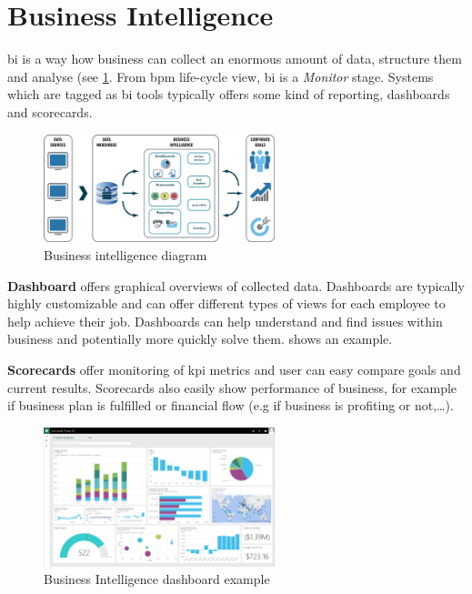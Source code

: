 \section{Business Intelligence}

\gls{bi} is a way how business can collect an enormous amount of data, structure them and analyse (see \cref{fig:bi-diagram}. From \gls{bpm} life-cycle view, \gls{bi} is a \textit{Monitor} stage. Systems which are tagged as \gls{bi} tools typically offers some kind of reporting, dashboards and scorecards. 

\begin{figure}[ht!]
	\centering
    \includegraphics[width=0.6\textwidth]{img/mortgage-business-intelligence-diagram.png}
    \caption{Business intelligence diagram\cite{business-intelligence-diagram-2018}}
    \label{fig:bi-diagram}
\end{figure}

\textbf{Dashboard} offers graphical overviews of collected data. Dashboards are typically highly customizable and can offer different types of views for each employee to help achieve their job. Dashboards can help understand and find issues within business and potentially more quickly solve them.  shows an example. 

\textbf{Scorecards} offer monitoring of \gls{kpi} metrics and user can easy compare goals and current results. Scorecards also easily show performance of business, for example if business plan is fulfilled or financial flow (e.g if business is profiting or not,\dots). 

\begin{figure}[ht!]
	\centering
    \includegraphics[width=0.6\textwidth]{img/microsoft-power-bi-dashboard.png}
    \caption{Business Intelligence dashboard example\cite{ms-business-intelligence-2018}}
    \label{fig:bi-dashboard}
\end{figure}
